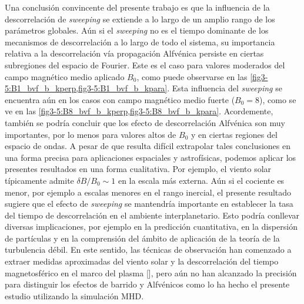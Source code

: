 Una conclusión convincente del presente trabajo es que la influencia
de la descorrelación de \textit{sweeping} se extiende a lo largo de un amplio
rango de los parámetros globales. Aún si el \textit{sweeping} no es el tiempo
dominante de los mecanismos de descorrelación a lo largo de todo el
sistema, su importancia relativa a la descorrelación vía propagación
Alfvénica persiste en ciertas subregiones del espacio de Fourier.
Este es el caso para valores moderados del campo magnético medio
aplicado $B_0$, como puede observarse en las
\cref{fig3-5:B1_bvf_b_kperp,fig3-5:B1_bvf_b_kpara}. Esta influencia del
\textit{sweeping} se encuentra aún en los casos con campo magnético medio
fuerte ($B_0 = 8$), como se ve en
las \cref{fig3-5:B8_bvf_b_kperp,fig3-5:B8_bvf_b_kpara}. Acordemente,
también se podría concluir que los efecto de descorrelación Alfvénica
son muy importantes, por lo menos para valores altos de $B_0$ y en
ciertas regiones del espacio de ondas.  A pesar de que resulta difícil
extrapolar tales conclusiones en una forma precisa para aplicaciones
espaciales y astrofísicas, podemos aplicar los presentes resultados en
una forma cualitativa.  Por ejemplo, el viento solar típicamente
admite $\delta B/B_0 \sim 1$ en la escala más externa.  Aún si el
cociente es menor, por ejemplo a escalas menores en el rango inercial,
el presente resultado sugiere que el efecto de \textit{sweeping} se
mantendría importante en establecer la tasa del tiempo de
descorrelación en el ambiente interplanetario. Esto podría conllevar
diversas implicaciones, por ejemplo en la predicción cuantitativa, en
la dispersión de partículas y en la comprensión del ámbito de
aplicación de la teoría de la turbulencia débil. En este sentido, las
técnicas de observación han comenzado a extraer medidas aproximadas
del viento solar y la descorrelación del tiempo magnetosférico en el
marco del plasma
[\cite{matthaeus_ensemble_2016,weygand_magnetic_2013}], pero aún no han
alcanzado la precisión para distinguir los efectos de barrido y
Alfvénicos como lo ha hecho el presente estudio utilizando la
simulación MHD.


